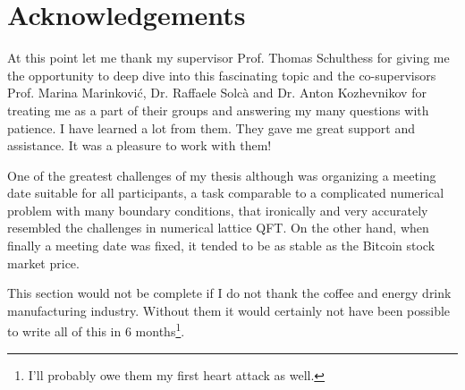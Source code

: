 \documentclass{article}
\theoremstyle{plain} %
\theoremstyle{convention} %
\theoremstyle{remark} %
\numberwithin{equation}{section}
\begin{document}
\section{Acknowledgements}

At this point let me thank my supervisor Prof. Thomas Schulthess for giving me the opportunity to deep dive into this fascinating topic and the co-supervisors Prof. Marina Marinković, Dr. Raffaele Solcà and Dr. Anton Kozhevnikov for treating me as a part of their groups and answering my many questions with patience. I have learned a lot from them. They gave me great support and assistance. It was a pleasure to work with them!

One of the greatest challenges of my thesis although was organizing a meeting date suitable for all participants, a task comparable to a complicated numerical problem with many boundary conditions, that ironically and very accurately resembled the challenges in numerical lattice QFT. On the other hand, when finally a meeting date was fixed, it tended to be as stable as the Bitcoin stock market price.

This section would not be complete if I do not thank the coffee and energy drink manufacturing industry. Without them it would certainly not have been possible to write all of this in \num{6} months\footnote{I'll probably owe them my first heart attack as well.}.


\newpage




\newpage
\end{document}
